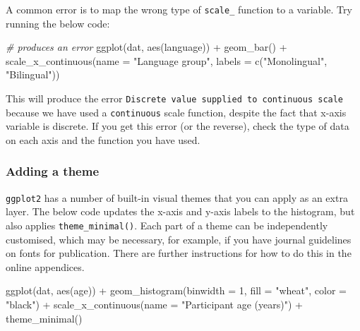 \documentclass[
  english,
  doc,floatsintext]{apa6}
\newenvironment{Shaded}{\begin{snugshade}}{\end{snugshade}}
\newcommand{\AttributeTok}[1]{\textcolor[rgb]{0.77,0.63,0.00}{#1}}
\newcommand{\CommentTok}[1]{\textcolor[rgb]{0.56,0.35,0.01}{\textit{#1}}}
\newcommand{\DecValTok}[1]{\textcolor[rgb]{0.00,0.00,0.81}{#1}}
\newcommand{\FunctionTok}[1]{\textcolor[rgb]{0.00,0.00,0.00}{#1}}
\newcommand{\NormalTok}[1]{#1}
\newcommand{\SpecialCharTok}[1]{\textcolor[rgb]{0.00,0.00,0.00}{#1}}
\newcommand{\StringTok}[1]{\textcolor[rgb]{0.31,0.60,0.02}{#1}}
\begin{document}
A common error is to map the wrong type of \texttt{scale\_} function to a variable. Try running the below code:

\begin{Shaded}
\begin{Highlighting}[]
\CommentTok{\# produces an error}
\FunctionTok{ggplot}\NormalTok{(dat, }\FunctionTok{aes}\NormalTok{(language)) }\SpecialCharTok{+}
  \FunctionTok{geom\_bar}\NormalTok{() }\SpecialCharTok{+}
  \FunctionTok{scale\_x\_continuous}\NormalTok{(}\AttributeTok{name =} \StringTok{"Language group"}\NormalTok{, }
                     \AttributeTok{labels =} \FunctionTok{c}\NormalTok{(}\StringTok{"Monolingual"}\NormalTok{, }\StringTok{"Bilingual"}\NormalTok{)) }
\end{Highlighting}
\end{Shaded}

This will produce the error \texttt{Discrete\ value\ supplied\ to\ continuous\ scale} because we have used a \texttt{continuous} scale function, despite the fact that x-axis variable is discrete. If you get this error (or the reverse), check the type of data on each axis and the function you have used.

\hypertarget{adding-a-theme}{%
\subsubsection{Adding a theme}\label{adding-a-theme}}

\texttt{ggplot2} has a number of built-in visual themes that you can apply as an extra layer. The below code updates the x-axis and y-axis labels to the histogram, but also applies \texttt{theme\_minimal()}. Each part of a theme can be independently customised, which may be necessary, for example, if you have journal guidelines on fonts for publication. There are further instructions for how to do this in the online appendices.

\begin{Shaded}
\begin{Highlighting}[]
\FunctionTok{ggplot}\NormalTok{(dat, }\FunctionTok{aes}\NormalTok{(age)) }\SpecialCharTok{+}
  \FunctionTok{geom\_histogram}\NormalTok{(}\AttributeTok{binwidth =} \DecValTok{1}\NormalTok{, }\AttributeTok{fill =} \StringTok{"wheat"}\NormalTok{, }\AttributeTok{color =} \StringTok{"black"}\NormalTok{) }\SpecialCharTok{+}
  \FunctionTok{scale\_x\_continuous}\NormalTok{(}\AttributeTok{name =} \StringTok{"Participant age (years)"}\NormalTok{) }\SpecialCharTok{+}
  \FunctionTok{theme\_minimal}\NormalTok{()}
\end{Highlighting}
\end{Shaded}
\end{document}
